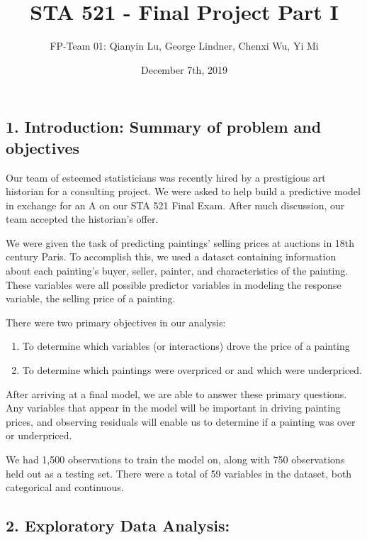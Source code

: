 \documentclass[]{article}
\title{STA 521 - Final Project Part I}
\author{FP-Team 01: Qianyin Lu, George Lindner, Chenxi Wu, Yi Mi}
\date{December 7th, 2019}
\providecommand{\tightlist}{%
  \setlength{\itemsep}{0pt}\setlength{\parskip}{0pt}}
\begin{document}
\maketitle

\hypertarget{introduction-summary-of-problem-and-objectives}{%
\subsection{1. Introduction: Summary of problem and
objectives}\label{introduction-summary-of-problem-and-objectives}}

Our team of esteemed statisticians was recently hired by a prestigious
art historian for a consulting project. We were asked to help build a
predictive model in exchange for an A on our STA 521 Final Exam. After
much discussion, our team accepted the historian's offer.

We were given the task of predicting paintings' selling prices at
auctions in 18th century Paris. To accomplish this, we used a dataset
containing information about each painting's buyer, seller, painter, and
characteristics of the painting. These variables were all possible
predictor variables in modeling the response variable, the selling price
of a painting.

There were two primary objectives in our analysis:

\begin{enumerate}
\def\labelenumi{\arabic{enumi})}
\tightlist
\item
  To determine which variables (or interactions) drove the price of a
  painting
\item
  To determine which paintings were overpriced or and which were
  underpriced.
\end{enumerate}

After arriving at a final model, we are able to answer these primary
questions. Any variables that appear in the model will be important in
driving painting prices, and observing residuals will enable us to
determine if a painting was over or underpriced.

We had 1,500 observations to train the model on, along with 750
observations held out as a testing set. There were a total of 59
variables in the dataset, both categorical and continuous.

\hypertarget{exploratory-data-analysis}{%
\subsection{2. Exploratory Data
Analysis:}\label{exploratory-data-analysis}}
\end{document}

